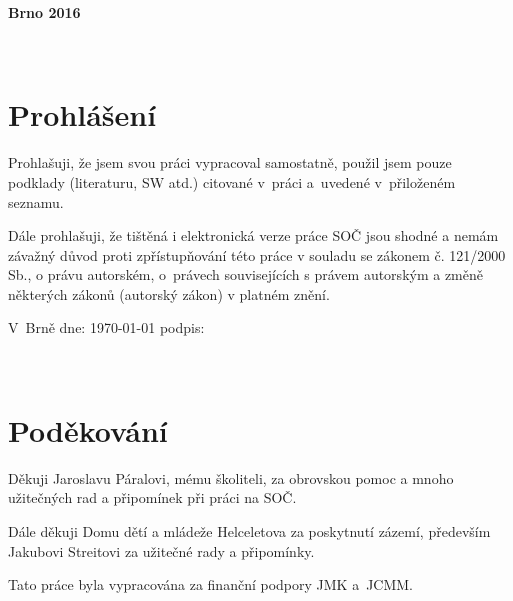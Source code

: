 \documentclass[12pt, a4paper, oneside]{article}
\begin{document}
\vspace{20mm}

\begin{center}
\textbf{Brno 2016}

\end{center}
\normalsize
\newpage  %

~ %

\vspace{10mm}

\section*{Prohlášení}


Prohlašuji, že jsem svou práci vypracoval samostatně, použil jsem pouze
podklady (literaturu, SW atd.) citované v~práci a~uvedené v~přiloženém seznamu.

Dále prohlašuji, že tištěná i elektronická verze práce SOČ jsou shodné a nemám závažný důvod proti zpřístupňování této práce v souladu se zákonem č. 121/2000 Sb., o právu autorském, o právech souvisejících s právem autorským a změně některých zákonů (autorský zákon) v platném znění.

\vspace{20mm}

 V~Brně  dne: \today{}    \hspace{50mm}                 podpis:


\newpage   %

~ %

\vspace{90mm}

\section*{Poděkování}

Děkuji Jaroslavu Páralovi, mému školiteli, za obrovskou pomoc a mnoho užitečných rad a připomínek při práci na SOČ.

Dále děkuji Domu dětí a mládeže Helceletova za poskytnutí zázemí, především Jakubovi Streitovi za užitečné rady a připomínky.

 Tato práce byla vypracována za finanční podpory JMK a~JCMM.
\end{document}
